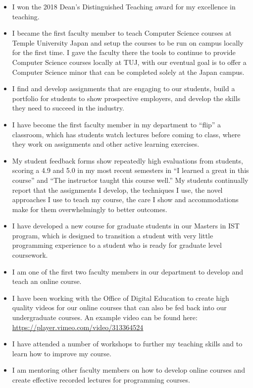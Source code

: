 \documentclass[]{article}
\begin{document}
\begin{itemize}
	\item I won the 2018 Dean’s Distinguished Teaching award for my excellence in teaching.
	\item I became the first faculty member to teach Computer Science courses at Temple University Japan and setup the courses to be run on campus locally for the first  time.  I gave the faculty there the tools to continue to provide Computer Science courses locally at TUJ, with our eventual goal is to offer a Computer Science minor that can be completed solely at the Japan campus.
	
	\item I find and develop assignments that are engaging to our students, build a portfolio for students to show prospective employers, and develop the skills they need to succeed in the industry.
	
	\item I have become the first faculty member in my department to ``flip'' a classroom, which has students watch lectures before coming to class, where they work on assignments and other active learning exercises.
	\item My student feedback forms show repeatedly high evaluations from students, scoring a 4.9 and 5.0 in my most recent semesters in ``I learned a great in this course'' and ``The instructor taught this course well.''  My students continually report that the assignments I develop, the techniques I use, the novel approaches I use to teach my course, the care I show and  accommodations make for them overwhelmingly to better outcomes. 

	 
	\item I have  developed a new course for graduate students in our Masters in IST program, which is designed to transition a student with very little programming experience to a student who is ready for graduate level coursework.
	\item I am one of the first two faculty members in our department to develop and teach an online course.
	\item I have been working with the Office of Digital Education to create high quality videos for our online courses that can also be fed back into our undergraduate courses.  An example video can be found here: \url{https://player.vimeo.com/video/313364524}
	\item I have attended a number of workshops to further my teaching skills and to learn how to improve my course.
	\item I am mentoring other faculty members on how to develop online courses and create effective recorded lectures for programming courses.
\end{itemize}
\end{document}
